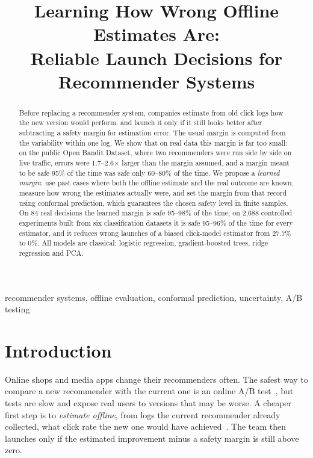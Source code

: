 \documentclass[conference]{IEEEtran}
\title{Learning How Wrong Offline Estimates Are:\\Reliable Launch Decisions for Recommender Systems}
\author{\IEEEauthorblockN{Nihar Sagar G}
\IEEEauthorblockA{Department of Electrical, Electronics and Communication Engineering\\
Indian Institute of Technology Dharwad, India}}
\begin{document}
\maketitle

\begin{abstract}
Before replacing a recommender system, companies estimate from old click logs how the new version would perform, and launch it only if it still looks better after subtracting a safety margin for estimation error. The usual margin is computed from the variability within one log. We show that on real data this margin is far too small: on the public Open Bandit Dataset, where two recommenders were run side by side on live traffic, errors were 1.7--2.6$\times$ larger than the margin assumed, and a margin meant to be safe 95\% of the time was safe only 60--80\% of the time. We propose a \emph{learned margin}: use past cases where both the offline estimate and the real outcome are known, measure how wrong the estimates actually were, and set the margin from that record using conformal prediction, which guarantees the chosen safety level in finite samples. On 84 real decisions the learned margin is safe 95--98\% of the time; on 2{,}688 controlled experiments built from six classification datasets it is safe 95--96\% of the time for every estimator, and it reduces wrong launches of a biased click-model estimator from 27.7\% to 0\%. All models are classical: logistic regression, gradient-boosted trees, ridge regression and PCA.
\end{abstract}

\begin{IEEEkeywords}
recommender systems, offline evaluation, conformal prediction, uncertainty, A/B testing
\end{IEEEkeywords}

\section{Introduction}
Online shops and media apps change their recommenders often. The safest way to compare a new recommender with the current one is an online A/B test~\cite{kohavi2009controlled}, but tests are slow and expose real users to versions that may be worse. A cheaper first step is to \emph{estimate offline}, from logs the current recommender already collected, what click rate the new one would have achieved~\cite{li2011replay,dudik2011dr,saito2021obd}. The team then launches only if the estimated improvement minus a safety margin is still above zero.
\end{document}
